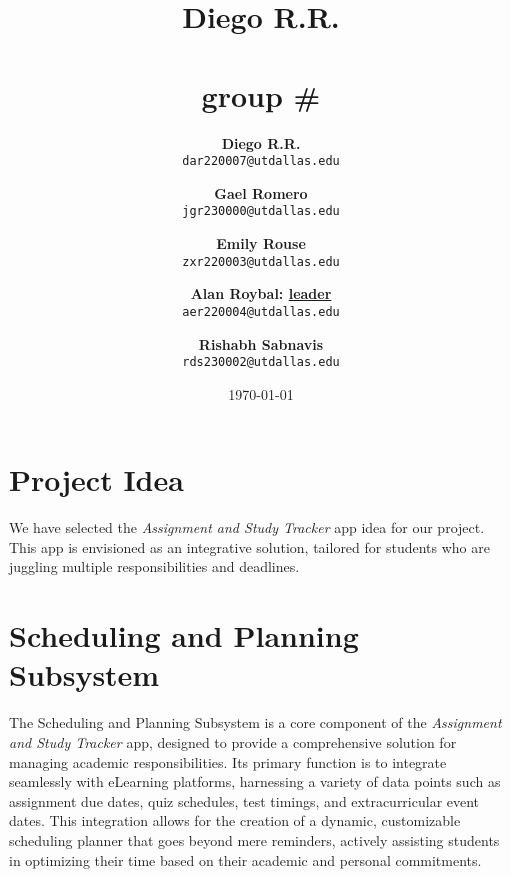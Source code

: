 \documentclass[12pt]{article}
\title{
    \textbf{Diego R.R.} \\
    \groupname \\
    \small{group} \# \groupnumber \\
}
\author{
    \textbf{Diego R.R.} \\
    \texttt{dar220007@utdallas.edu} \\
    \and 
    \textbf{Gael Romero} \\
    \texttt{jgr230000@utdallas.edu} \\
    \and
    \textbf{Emily Rouse} \\
    \texttt{zxr220003@utdallas.edu} \\
    \and
    \textbf{Alan Roybal: \underline{leader}} \\
    \texttt{aer220004@utdallas.edu} \\
    \and
    \textbf{Rishabh Sabnavis} \\
    \texttt{rds230002@utdallas.edu}
}
\date{\today} %
\newcommand\app{\textit{Assignment and Study Tracker} app\xspace}
\begin{document}
\maketitle %

\section{Project Idea} 
    We have selected the \app idea for our project. This app is envisioned as an integrative solution, tailored for students who are juggling multiple responsibilities and deadlines.

\newcommand\subsystem{Scheduling and Planning Subsystem\xspace}
\newcommand\dataSubsystem{Data Integration and Synchronization Subsystem\xspace}
\newcommand\alertsSubsystem{Notification, Alerts and Data Interpretation subsystem\xspace}
\newcommand\userSubsystem{User Profile Management and Customization Subsystem\xspace}
\newcommand\securitySubsystem{Security and Privacy Subsystem\xspace}


\section{\subsystem}
    The \subsystem is a core component of the \app, designed to provide a comprehensive solution for managing academic responsibilities. Its primary function is to integrate seamlessly with eLearning platforms, harnessing a variety of data points such as assignment due dates, quiz schedules, test timings, and extracurricular event dates. This integration allows for the creation of a dynamic, customizable scheduling planner that goes beyond mere reminders, actively assisting students in optimizing their time based on their academic and personal commitments.

\newcommand\scheduler{\textit{Scheduler}\xspace}

\newcommand\dataRetrieval{\textit{Data Retrieval Function}\xspace}
\newcommand\persoanlizedScheduler{\textit{Personalized Scheduler Function}\xspace}
\newcommand\dynamicScheduler{\textit{Dynamic Scheduler Adjustment Function}\xspace}
\newcommand\userInterface{\textit{User Interaction and Interface Function}\xspace}
\end{document}
